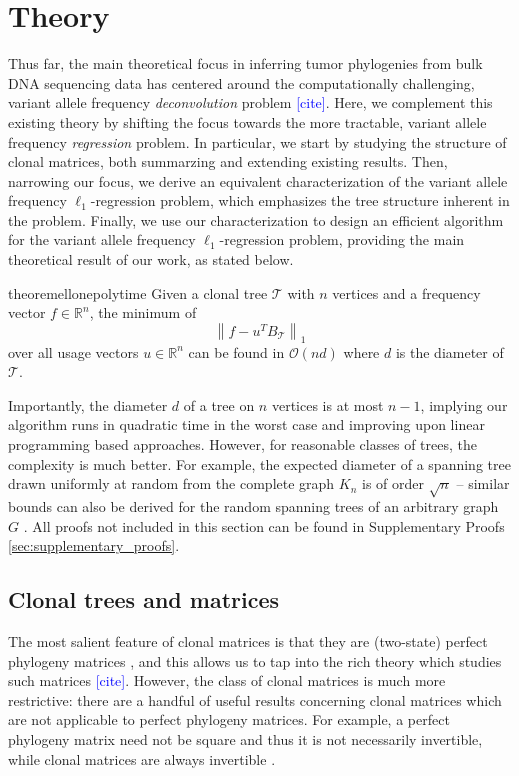 \documentclass[10pt]{article}
\newcommand{\henri}[1]{\textcolor{blue}{[#1]}}
\newcommand{\tree}{\mathcal{T}}
\begin{document}
\section{Theory}
Thus far, the main theoretical focus in inferring tumor phylogenies from bulk DNA sequencing data 
has centered around the computationally challenging, variant allele frequency \emph{deconvolution} 
problem \henri{cite}. Here, we complement this existing theory by shifting the focus 
towards the more tractable, variant allele frequency \emph{regression} problem. In 
particular, we start by studying the structure of clonal matrices, both summarzing 
and extending existing results. Then, narrowing our focus, we derive an equivalent
characterization of the variant allele frequency $\ell_1$-regression problem, which 
emphasizes the tree structure inherent in the problem. Finally, we use our
characterization to design an efficient algorithm for the variant allele 
frequency $\ell_1$-regression problem, providing the main theoretical result of 
our work, as stated below. 
\begin{restatable}{theorem}{ellonepolytime}
    \label{thm:ellonepolytime}
    Given a clonal tree $\tree$ with $n$ vertices and a frequency vector $f \in \mathbb{R}^n$, the
    minimum of 
    \[\left\lVert f - u^T B_{\tree}\right\rVert_1 \]
    over all usage vectors $u \in \mathbb{R}^n$ can be found in $\mathcal{O}(nd)$ where $d$ is 
    the diameter of $\tree$.
\end{restatable}

Importantly, the diameter $d$ of a tree on $n$ vertices is at most $n - 1$, implying our algorithm 
runs in quadratic time in the worst case and improving upon linear programming based approaches. 
However, for reasonable classes of trees, the complexity is much better. For example, the expected
diameter of a spanning tree drawn uniformly at random from the complete graph $K_n$ is 
of order $\sqrt{n}$ -- similar bounds can also be derived 
for the random spanning trees of an arbitrary graph $G$ \cite{renyi_height_1967, chung_diameter_2012}.
All proofs not included in this section can be found in
Supplementary Proofs \ref{sec:supplementary_proofs}.


\subsection{Clonal trees and matrices}
\label{sec:clonal-trees-matrices}

The most salient feature of clonal matrices is that they are (two-state) perfect phylogeny matrices 
\cite{el-kebir_reconstruction_2015}, and this allows us to tap into the rich theory 
which studies such matrices \henri{cite}.
However, the class of clonal matrices is much more restrictive:
there are a handful of useful results concerning clonal matrices 
which are not applicable to perfect phylogeny matrices.
For example, a perfect phylogeny matrix need
not be square and thus it is not necessarily invertible, while clonal matrices are 
always invertible \cite{el-kebir_reconstruction_2015}. 
\end{document}
